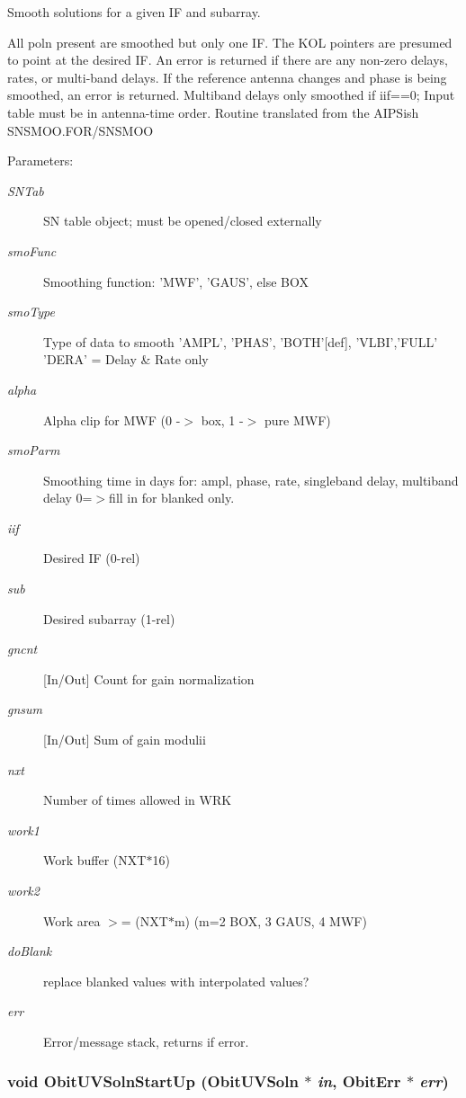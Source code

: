 Smooth solutions for a given IF and subarray. 

All poln present are smoothed but only one IF. The KOL pointers are presumed to point at the desired IF. An error is returned if there are any non-zero delays, rates, or multi-band delays. If the reference antenna changes and phase is being smoothed, an error is returned. Multiband delays only smoothed if iif==0; Input table must be in antenna-time order. Routine translated from the AIPSish SNSMOO.FOR/SNSMOO \begin{Desc}
\item[Parameters:]
\begin{description}
\item[{\em SNTab}]SN table object; must be opened/closed externally \item[{\em smo\-Func}]Smoothing function: 'MWF', 'GAUS', else BOX \item[{\em smo\-Type}]Type of data to smooth 'AMPL', 'PHAS', 'BOTH'[def], 'VLBI','FULL' 'DERA' = Delay \& Rate only \item[{\em alpha}]Alpha clip for MWF (0 -$>$ box, 1 -$>$ pure MWF) \item[{\em smo\-Parm}]Smoothing time in days for: ampl, phase, rate, singleband delay, multiband delay 0=$>$fill in for blanked only. \item[{\em iif}]Desired IF (0-rel) \item[{\em sub}]Desired subarray (1-rel) \item[{\em gncnt}][In/Out] Count for gain normalization \item[{\em gnsum}][In/Out] Sum of gain modulii \item[{\em nxt}]Number of times allowed in WRK \item[{\em work1}]Work buffer (NXT$\ast$16) \item[{\em work2}]Work area $>$= (NXT$\ast$m) (m=2 BOX, 3 GAUS, 4 MWF) \item[{\em do\-Blank}]replace blanked values with interpolated values? \item[{\em err}]Error/message stack, returns if error. \end{description}
\end{Desc}
\subsubsection{\setlength{\rightskip}{0pt plus 5cm}void Obit\-UVSoln\-Start\-Up ({\bf Obit\-UVSoln} $\ast$ {\em in}, {\bf Obit\-Err} $\ast$ {\em err})}\label{ObitUVSoln_8c_a23}


